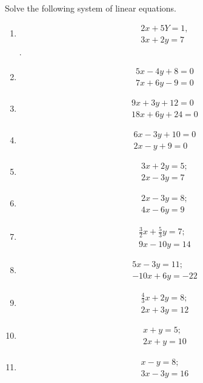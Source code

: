  Solve the following system of linear equations.
\begin{enumerate}[label=\thesubsection.\arabic*,ref=\thesubsection.\theenumi]
\item 
 \begin{align}2x+5Y=1,\\ 3x+2y=7\end{align}.
\item \begin{align}
	5x-4y+8=0\\ 
      	7x+6y-9=0
	\end{align}
\item \begin{align}
	9x+3y+12=0\\
	18x+6y+24=0
	\end{align}
\item \begin{align}
        6x-3y+10=0\\
	2x-y+9=0
	\end{align}
	\item \begin{align}
       		3x+2y=5; \\
      		2x-3y=7
    	       \end{align} 
	\item \begin{align}
		2x-3y=8;\\
		4x-6y=9
		\end{align}
	\item \begin{align}
		\frac{3}{2}x+\frac{5}{3}y=7;\\
		9x-10y=14
		\end{align}
\item \begin{align}
		5x-3y=11;\\
		-10x+6y=-22
	\end{align}
\item \begin{align}
         \frac{4}{3}x+2y=8;\\
	  2x+3y=12
	\end{align}
\item \begin{align}
	x+y=5;\\
	2x+y=10
	\end{align}
\item \begin{align}
	x-y=8;\\
	3x-3y=16
	\end{align}

\end{enumerate}
